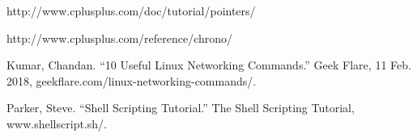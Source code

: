 {\footnotesize
\begin{thebibliography}{99}
	 http://www.cplusplus.com/doc/tutorial/pointers/
	
	 http://www.cplusplus.com/reference/chrono/
	
	 Kumar, Chandan. “10 Useful Linux Networking Commands.” Geek Flare, 11 Feb. 2018, geekflare.com/linux-networking-commands/. 
	
	  Parker, Steve. “Shell Scripting Tutorial.” The Shell Scripting Tutorial, www.shellscript.sh/. 
\end{thebibliography}
}

